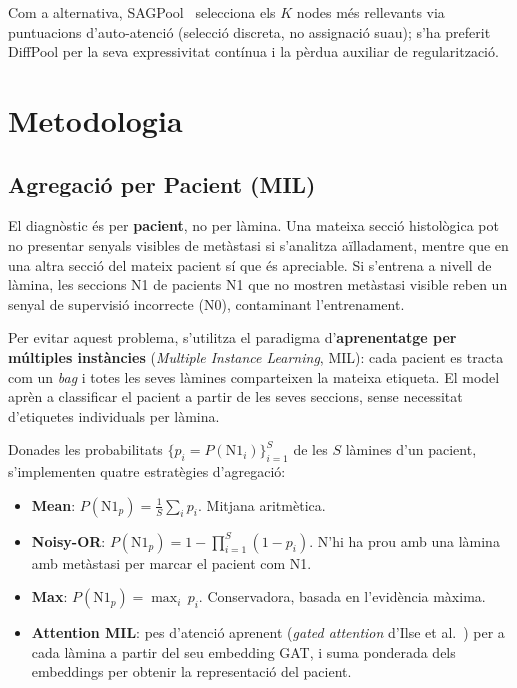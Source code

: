 \documentclass[10pt,a4paper,twocolumn,twoside]{article}
\begin{document}
Com a alternativa, SAGPool~\cite{lee2019selfattentiongraphpooling} selecciona els $K$ nodes més
rellevants via puntuacions d'auto-atenció (selecció discreta, no assignació suau); s'ha preferit
DiffPool per la seva expressivitat contínua i la pèrdua auxiliar de regularització.


\section{Metodologia}

\subsection{Agregació per Pacient (MIL)}
\label{sec:mil}

El diagnòstic és per \textbf{pacient}, no per làmina. Una mateixa secció histològica pot no presentar senyals
visibles de metàstasi si s'analitza aïlladament, mentre que en una altra secció del mateix pacient sí que és
apreciable. Si s'entrena a nivell de làmina, les seccions N1 de pacients N1 que no mostren metàstasi visible
reben un senyal de supervisió incorrecte (N0), contaminant l'entrenament.

Per evitar aquest problema, s'utilitza el paradigma d'\textbf{aprenentatge per múltiples instàncies}
(\textit{Multiple Instance Learning}, MIL): cada pacient es tracta com un \textit{bag} i totes les seves
làmines comparteixen la mateixa etiqueta. El model aprèn a classificar el pacient a partir de les
seves seccions, sense necessitat d'etiquetes individuals per làmina.

Donades les probabilitats $\{p_i = P(\text{N1}_i)\}_{i=1}^{S}$ de les $S$ làmines d'un pacient,
s'implementen quatre estratègies d'agregació:

\begin{itemize}
    \item \textbf{Mean}: $P(\text{N1}_{p}) = \frac{1}{S}\sum_i p_i$. Mitjana aritmètica.
    \item \textbf{Noisy-OR}: $P(\text{N1}_{p}) = 1 - \prod_{i=1}^{S}(1 - p_i)$. N'hi ha prou
    amb una làmina amb metàstasi per marcar el pacient com N1.
    \item \textbf{Max}: $P(\text{N1}_{p}) = \max_i\, p_i$. Conservadora, basada en l'evidència
    màxima.
    \item \textbf{Attention MIL}: pes d'atenció aprenent (\textit{gated attention} d'Ilse et
    al.~\cite{ilse2018attentionbaseddeepmultipleinstance}) per a cada làmina a partir del seu
    embedding GAT, i suma ponderada dels embeddings per obtenir la representació del pacient.
\end{itemize}
\end{document}
